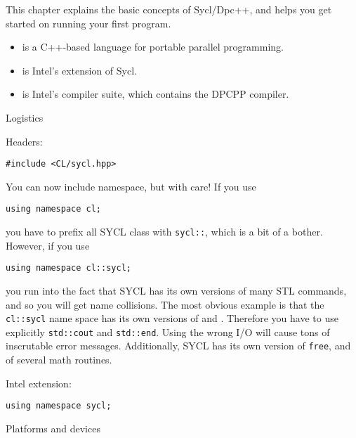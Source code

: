 
This chapter explains the basic concepts of Sycl/Dpc++,
and helps you get
started on running your first program.

\begin{itemize}
\item {} is a C++-based language for portable parallel programming.
\item {} is Intel's extension of Sycl.
\item {} is Intel's compiler suite,
  which contains the \ac{DPCPP} compiler.
\end{itemize}

 {Logistics}

Headers:
\begin{lstlisting}
#include <CL/sycl.hpp>
\end{lstlisting}

You can now include namespace, but with care!
If you use
\begin{lstlisting}
using namespace cl;
\end{lstlisting}
you have to prefix all SYCL class with \lstinline+sycl::+,
which is a bit of a bother.
However, if you use
\begin{lstlisting}
using namespace cl::sycl;
\end{lstlisting}
you run into the fact that SYCL has its own versions of many \ac{STL}
commands, and so you will get name collisions.
The most obvious example is that 
the \lstinline+cl::sycl+ name space has its own versions of  and .
Therefore you have to use explicitly \lstinline+std::cout+ and \lstinline+std::end+.
Using the wrong I/O will cause tons of inscrutable error messages.
Additionally, SYCL has its own version of \lstinline{free},
and of several math routines.

Intel extension:
\begin{lstlisting}
using namespace sycl;
\end{lstlisting}

 {Platforms and devices}

